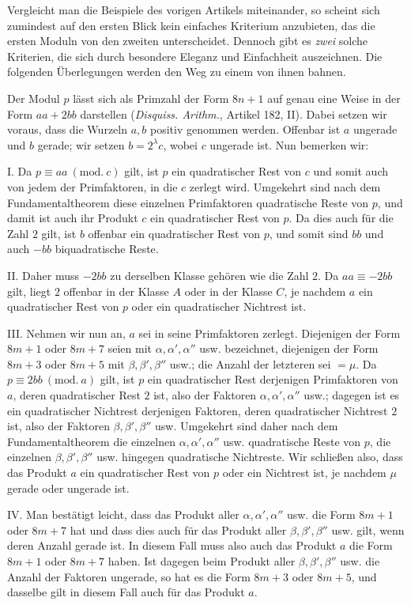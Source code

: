 %
Vergleicht man die Beispiele des vorigen Artikels miteinander, so scheint sich zumindest auf den ersten Blick kein einfaches Kriterium anzubieten, das die ersten Moduln von den zweiten unterscheidet. Dennoch gibt es \emph{zwei} solche Kriterien, die sich durch besondere Eleganz und Einfachheit auszeichnen. Die folgenden Überlegungen werden den Weg zu einem von ihnen bahnen.

Der Modul $p$ lässt sich als Primzahl der Form $8n+1$ auf genau eine Weise in der Form $aa+2bb$ darstellen (\emph{Disquiss. Arithm.}, Artikel 182, II). Dabei setzen wir voraus, dass die Wurzeln $a,b$ positiv genommen werden. Offenbar ist $a$ ungerade und $b$ gerade; wir setzen $b=2^\lambda c$, wobei $c$ ungerade ist. Nun bemerken wir:

I. Da $p\equiv aa\ (\mathrm{mod.}\ c)$ gilt, ist $p$ ein quadratischer Rest von $c$ und somit auch von jedem der Primfaktoren, in die $c$ zerlegt wird. Umgekehrt sind nach dem Fundamentaltheorem diese einzelnen Primfaktoren quadratische Reste von $p$, und damit ist auch ihr Produkt $c$ ein quadratischer Rest von $p$. Da dies auch für die Zahl $2$ gilt, ist $b$ offenbar ein quadratischer Rest von $p$, und somit sind $bb$ und auch $-bb$ biquadratische Reste.

II. Daher muss $-2bb$ zu derselben Klasse gehören wie die Zahl $2$. Da $aa\equiv-2bb$ gilt, liegt $2$ offenbar in der Klasse $A$ oder in der Klasse $C$, je nachdem $a$ ein quadratischer Rest von $p$ oder ein quadratischer Nichtrest ist.

III. Nehmen wir nun an, $a$ sei in seine Primfaktoren zerlegt. Diejenigen der Form $8m+1$ oder $8m+7$ seien mit $\alpha,\alpha',\alpha''$ usw. bezeichnet, diejenigen der Form $8m+3$ oder $8m+5$ mit $\beta,\beta',\beta''$ usw.; die Anzahl der letzteren sei $=\mu$. Da $p\equiv2bb\ (\mathrm{mod.}\ a)$ gilt, ist $p$ ein quadratischer Rest derjenigen Primfaktoren von $a$, deren quadratischer Rest $2$ ist, also der Faktoren $\alpha,\alpha',\alpha''$ usw.; dagegen ist es ein quadratischer Nichtrest derjenigen Faktoren, deren quadratischer Nichtrest $2$ ist, also der Faktoren $\beta,\beta',\beta''$ usw. Umgekehrt sind daher nach dem Fundamentaltheorem die einzelnen $\alpha,\alpha',\alpha''$ usw. quadratische Reste von $p$, die einzelnen $\beta,\beta',\beta''$ usw. hingegen quadratische Nichtreste. Wir schließen also, dass das Produkt $a$ ein quadratischer Rest von $p$ oder ein Nichtrest ist, je nachdem $\mu$ gerade oder ungerade ist.

IV. Man bestätigt leicht, dass das Produkt aller $\alpha,\alpha',\alpha''$ usw. die Form $8m+1$ oder $8m+7$ hat und dass dies auch für das Produkt aller $\beta,\beta',\beta''$ usw. gilt, wenn deren Anzahl gerade ist. In diesem Fall muss also auch das Produkt $a$ die Form $8m+1$ oder $8m+7$ haben. Ist dagegen beim Produkt aller $\beta,\beta',\beta''$ usw.\space%
%
die Anzahl der Faktoren ungerade, so hat es die Form $8m+3$ oder $8m+5$, und dasselbe gilt in diesem Fall auch für das Produkt $a$.

